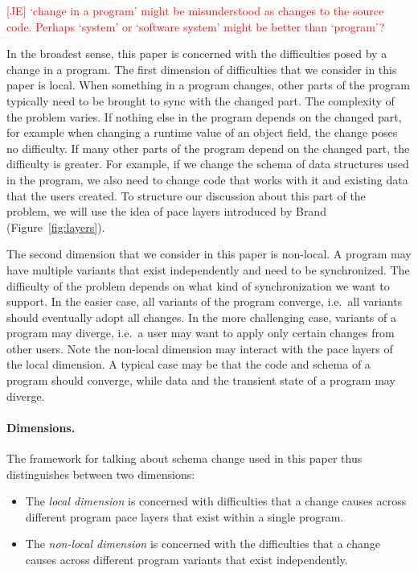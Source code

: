 \documentclass[english,submission]{programming}
\begin{document}
\textcolor{red}{[JE] `change in a program' might be misunderstood as changes to the source code. Perhaps `system' or `software system' might be better than `program'? }

In the broadest sense, this paper is concerned with the difficulties posed by a change
in a program. The first dimension of difficulties that we consider in this paper is
local. When something in a program changes, other parts of the program typically
need to be brought to sync with the changed part. The complexity of the problem varies.
If nothing else in the program depends on the changed part, for example when changing
a runtime value of an object field, the change poses no difficulty.
If many other parts of the program depend on the changed part, the difficulty is greater.
For example, if we change the schema of data structures used in the program, we also need to
change code that works with it and existing data that the users created. To structure our
discussion about this part of the problem, we will use the idea of pace layers introduced by
Brand \cite{Brand95,Brand18} (Figure~\ref{fig:layers}).

The second dimension that we consider in this paper is non-local. A program may have multiple
variants that exist independently and need to be synchronized. The difficulty of the problem
depends on what kind of synchronization we want to support. In the easier case, all variants
of the program converge, i.e.~all variants should eventually adopt all changes. In the more
challenging case, variants of a program may diverge, i.e.~a user may want to apply only certain
changes from other users. Note the non-local dimension may interact with the pace layers of the
local dimension. A typical case may be that the code and schema of a program should converge,
while data and the transient state of a program may diverge.

\paragraph{Dimensions.}
The framework for talking about schema change used in this paper thus distinguishes between
two dimensions:

\begin{itemize}
  \item The \emph{local dimension} is concerned with difficulties that a change causes
    across different program pace layers that exist within a single program.
  \item The \emph{non-local dimension} is concerned with the difficulties that a change causes
    across different program variants that exist independently.
\end{itemize}
\end{document}
